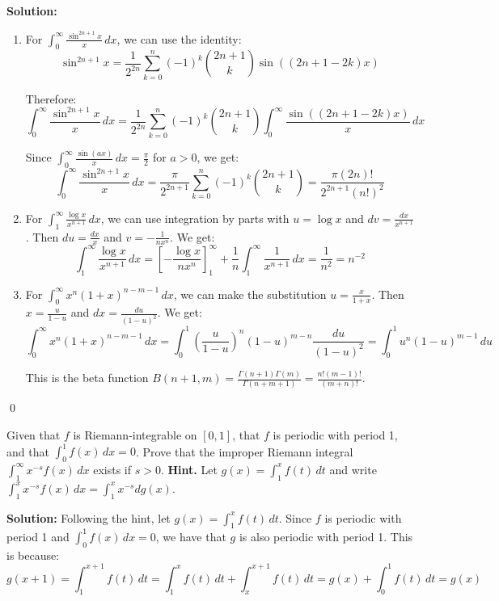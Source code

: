 \noindent\textbf{Solution:}
\begin{enumerate}[label=(\alph*)]
    \item For $\int_{0}^{\infty} \frac{\sin^{2n+1} x}{x} \, dx$, we can use the identity:
    \[\sin^{2n+1} x = \frac{1}{2^{2n}} \sum_{k=0}^{n} (-1)^k \binom{2n+1}{k} \sin((2n+1-2k)x)\]
    
    Therefore:
    \[\int_{0}^{\infty} \frac{\sin^{2n+1} x}{x} \, dx = \frac{1}{2^{2n}} \sum_{k=0}^{n} (-1)^k \binom{2n+1}{k} \int_{0}^{\infty} \frac{\sin((2n+1-2k)x)}{x} \, dx\]
    
    Since $\int_{0}^{\infty} \frac{\sin(ax)}{x} \, dx = \frac{\pi}{2}$ for $a > 0$, we get:
    \[\int_{0}^{\infty} \frac{\sin^{2n+1} x}{x} \, dx = \frac{\pi}{2^{2n+1}} \sum_{k=0}^{n} (-1)^k \binom{2n+1}{k} = \frac{\pi(2n)!}{2^{2n+1}(n!)^2}\]
    
    \item For $\int_{1}^{\infty} \frac{\log x}{x^{n+1}} \, dx$, we can use integration by parts with $u = \log x$ and $dv = \frac{dx}{x^{n+1}}$. Then $du = \frac{dx}{x}$ and $v = -\frac{1}{nx^n}$. We get:
    \[\int_{1}^{\infty} \frac{\log x}{x^{n+1}} \, dx = \left[-\frac{\log x}{nx^n}\right]_{1}^{\infty} + \frac{1}{n} \int_{1}^{\infty} \frac{1}{x^{n+1}} \, dx = \frac{1}{n^2} = n^{-2}\]
    
    \item For $\int_{0}^{\infty} x^n (1 + x)^{n-m-1} \, dx$, we can make the substitution $u = \frac{x}{1+x}$. Then $x = \frac{u}{1-u}$ and $dx = \frac{du}{(1-u)^2}$. We get:
    \[\int_{0}^{\infty} x^n (1 + x)^{n-m-1} \, dx = \int_{0}^{1} \left(\frac{u}{1-u}\right)^n (1-u)^{m-n} \frac{du}{(1-u)^2} = \int_{0}^{1} u^n (1-u)^{m-1} \, du\]
    
    This is the beta function $B(n+1, m) = \frac{\Gamma(n+1)\Gamma(m)}{\Gamma(n+m+1)} = \frac{n!(m-1)!}{(m+n)!}$.
\end{enumerate}\qed


\begin{problembox}
Given that $f$ is Riemann-integrable on $[0, 1]$, that $f$ is periodic with period 1, and that $\int_{0}^{1} f(x) \, dx = 0$. Prove that the improper Riemann integral $\int_{1}^{\infty} x^{-s} f(x) \, dx$ exists if $s > 0$. \textbf{Hint.} Let $g(x) = \int_{1}^{x} f(t) \, dt$ and write $\int_{1}^{x} x^{-s} f(x) \, dx = \int_{1}^{x} x^{-s} dg(x)$.
\end{problembox}

\noindent\textbf{Solution:}
Following the hint, let $g(x) = \int_{1}^{x} f(t) \, dt$. Since $f$ is periodic with period 1 and $\int_{0}^{1} f(x) \, dx = 0$, we have that $g$ is also periodic with period 1. This is because:
\[g(x+1) = \int_{1}^{x+1} f(t) \, dt = \int_{1}^{x} f(t) \, dt + \int_{x}^{x+1} f(t) \, dt = g(x) + \int_{0}^{1} f(t) \, dt = g(x)\]

